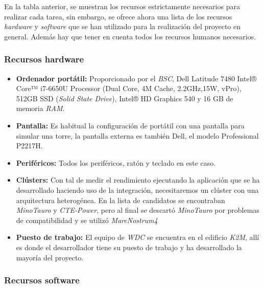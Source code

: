 En la tabla anterior, se muestran los recursos estrictamente necesarios para realizar cada tarea, sin embargo, se ofrece ahora una lista de los recursos \textit{hardware} y \textit{software} que se han utilizado para la realización del proyecto en general. Además hay que tener en cuenta todos los recursos humanos necesarios.

\subsubsection{Recursos hardware}

\begin{itemize}

 \item \textbf{Ordenador portátil:} Proporcionado por el \textit{BSC}, Dell Latitude 7480 Intel® Core™ i7-6650U Processor (Dual Core, 4M Cache, 2.2GHz,15W, vPro), 512GB SSD (\textit{Solid State Drive}), Intel® HD Graphics 540 y 16 GB de memoria \textit{RAM}.
 
 \item \textbf{Pantalla:} Es habitual la configuración de portátil con una pantalla para simular una torre, la pantalla externa es también Dell, el modelo Professional P2217H.
 
 \item \textbf{Periféricos:} Todos los periféricos, ratón y teclado en este caso.
 
 \item \textbf{Clústers:} Con tal de medir el rendimiento ejecutando la aplicación que se ha desarrollado haciendo uso de la integración, necesitaremos un clúster con una arquitectura heterogénea. En la lista de candidatos se encontraban \textit{MinoTauro} y \textit{CTE-Power}, pero al final se descartó \textit{MinoTauro} por problemas de compatibilidad y se utilizó \textit{MareNostrum4}
 
 \item \textbf{Puesto de trabajo:} El equipo de \textit{WDC} se encuentra en el edificio \textit{K2M}, allí es donde el desarrollador tiene su puesto de trabajo y ha desarrollado la mayoría del proyecto.
 
\end{itemize}

\subsubsection{Recursos software}

